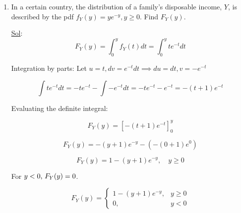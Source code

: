 \begin{enumerate}

  \item[14.] In a certain country, the distribution of a family's
    disposable income, \(Y\), is described by the pdf \(f_Y(y) =
    ye^{-y}, y \geq 0\). Find \(F_Y(y)\).

    \underline{Sol}:\\

    \[F_Y(y) = \int_{0}^{y} f_Y(t) dt = \int_{0}^{y} t e^{-t} dt\]

    Integration by parts: Let \(u = t, dv = e^{-t} dt \implies du =
    dt, v = -e^{-t}\)

    \[\int t e^{-t} dt = -t e^{-t} - \int -e^{-t} dt = -t e^{-t} -
    e^{-t} = -(t+1)e^{-t}\]

    Evaluating the definite integral:

    \[F_Y(y) = \left[ -(t+1)e^{-t} \right]_0^y\]

    \[F_Y(y) = -(y+1)e^{-y} - (-(0+1)e^0)\]

    \[F_Y(y) = 1 - (y+1)e^{-y}, \quad y \ge 0\]

    For \(y < 0$, $F_Y(y) = 0\).

    \[F_Y(y) =
      \begin{cases} 1 - (y+1)e^{-y}, & y \ge 0 \\ 0, & y < 0
    \end{cases}\]
\end{enumerate}
